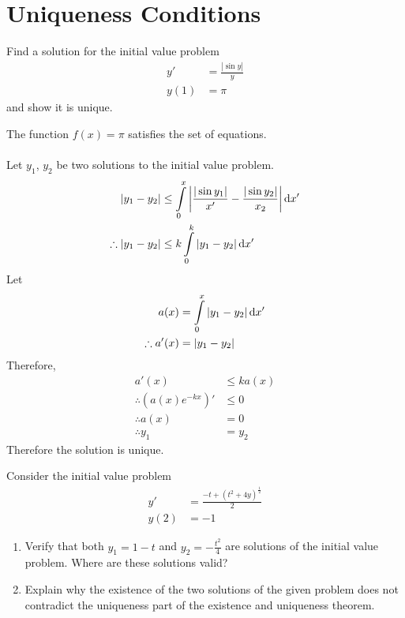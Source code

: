 \documentclass[fleqn, a4paper, 12pt, oneside]{amsart}
\theoremstyle{definition}
\theoremstyle{theorem}
\begin{document}
\part{Uniqueness Conditions}

\begin{question}
	Find a solution for the initial value problem
	\begin{align*}
		y'   & = \frac{|\sin y|}{y} \\
		y(1) & = \pi
	\end{align*}
	and show it is unique.
\end{question}

\begin{solution}
	The function $f(x) = \pi$ satisfies the set of equations.\\
	~\\
	Let $y_1$, $y_2$ be two solutions to the initial value problem.\\
	\begin{align*}
		|y_1 - y_2|            & \le \int\limits_{0}^{x} \left| \frac{|\sin y_1|}{x'} - \frac{|\sin y_2|}{x_2} \right| \dif x' \\
		\therefore |y_1 - y_2| & \le k \int\limits_{0}^{k} |y_1 - y_2| \dif x'
	\end{align*}
	Let
	\begin{align*}
		a(x)             & = \int\limits_{0}^{x} |y_1 - y_2| \dif x' \\
		\therefore a'(x) & = |y_1 - y_2|
	\end{align*}
	Therefore,
	\begin{align*}
		a'(x)                                    & \le k a(x) \\
		\therefore \left( a(x) e^{-k x} \right)' & \le 0      \\
		\therefore a(x)                          & = 0        \\
		\therefore y_1                           & = y_2
	\end{align*}
	Therefore the solution is unique.
\end{solution}

\begin{question}
	Consider the initial value problem
	\begin{align*}
		y'   & = \frac{-t + (t^2 + 4 y)^{\frac{1}{2}}}{2} \\
		y(2) & = -1
	\end{align*}
	\begin{enumerate}
		\item
			Verify that both $y_1 = 1 - t$ and $y_2 = -\frac{t^2}{4}$ are solutions of the initial value problem.
			Where are these solutions valid?
		\item
			Explain why the existence of the two solutions of the given problem does not contradict the uniqueness part of the existence and uniqueness theorem.			
	\end{enumerate}
\end{question}
\end{document}
